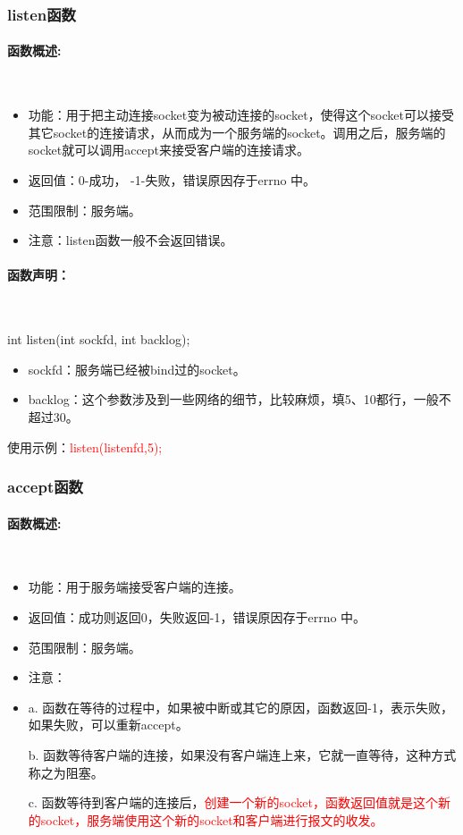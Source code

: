 \documentclass[UTF8]{article}%
\begin{document}
\subsubsection{listen函数}

\paragraph{函数概述:}~{}

\begin{itemize}
    \item 功能：用于把主动连接socket变为被动连接的socket，使得这个socket可以接受其它socket的连接请求，从而成为一个服务端的socket。调用之后，服务端的socket就可以调用accept来接受客户端的连接请求。
    \item 返回值：0-成功， -1-失败，错误原因存于errno 中。
    \item 范围限制：服务端。
    \item 注意：listen函数一般不会返回错误。
\end{itemize}

\paragraph{函数声明：}~{}

int listen(int sockfd, int backlog);

\begin{itemize}
    \item sockfd：服务端已经被bind过的socket。
    \item backlog：这个参数涉及到一些网络的细节，比较麻烦，填5、10都行，一般不超过30。
\end{itemize}

使用示例：\textcolor{red}{listen(listenfd,5);}

\subsubsection{accept函数}

\paragraph{函数概述:}~{}

\begin{itemize}
    \item 功能：用于服务端接受客户端的连接。
    \item 返回值：成功则返回0，失败返回-1，错误原因存于errno 中。
    \item 范围限制：服务端。
    \item 注意：
    \item 
    a. 函数在等待的过程中，如果被中断或其它的原因，函数返回-1，表示失败，如果失败，可以重新accept。

    b. 函数等待客户端的连接，如果没有客户端连上来，它就一直等待，这种方式称之为阻塞。

    c. 函数等待到客户端的连接后，\textcolor{red}{创建一个新的socket，函数返回值就是这个新的socket，服务端使用这个新的socket和客户端进行报文的收发。}

\end{itemize}
\end{document}
